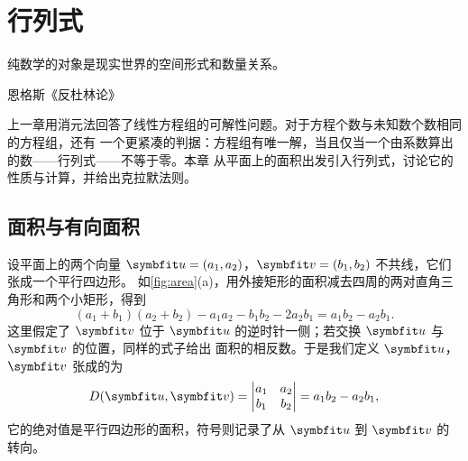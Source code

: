 \chapter{行列式}\label{chap:det}

\epigraph{纯数学的对象是现实世界的空间形式和数量关系。}{恩格斯《反杜林论》}
\chaptertoc

上一章用消元法回答了线性方程组的可解性问题。对于方程个数与未知数个数相同的方程组，还有
一个更紧凑的判据：方程组有唯一解，当且仅当一个由系数算出的数——行列式——不等于零。本章
从平面上的面积出发引入行列式，讨论它的性质与计算，并给出克拉默法则。

\section{面积与有向面积}\label{sec:area}

设平面上的两个向量 $\vb{u}=(a_1,a_2)$，$\vb{v}=(b_1,b_2)$ 不共线，它们张成一个平行四边形。
如\cref{fig:area}(a)，用外接矩形的面积减去四周的两对直角三角形和两个小矩形，得到
\[
  (a_1+b_1)(a_2+b_2)-a_1a_2-b_1b_2-2a_2b_1=a_1b_2-a_2b_1 .
\]
这里假定了 $\vb{v}$ 位于 $\vb{u}$ 的逆时针一侧；若交换 $\vb{u}$ 与 $\vb{v}$ 的位置，同样的式子给出
面积的相反数。于是我们定义 $\vb{u}$，$\vb{v}$ 张成的为
\begin{equation}\label{eq:2x2}
  D(\vb{u},\vb{v})=\begin{vmatrix}a_1&a_2\\b_1&b_2\end{vmatrix}=a_1b_2-a_2b_1 ,
\end{equation}
它的绝对值是平行四边形的面积，符号则记录了从 $\vb{u}$ 到 $\vb{v}$ 的转向。

